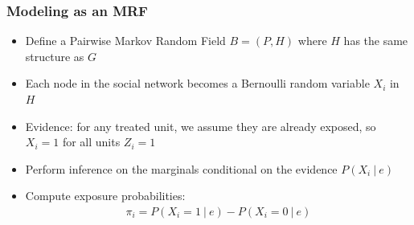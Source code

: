 \documentclass[
	11pt, %
]{beamer}
\begin{document}
\begin{frame}
	\frametitle{Modeling as an MRF}
	\begin{itemize}
		\setlength\itemsep{1em}
		\item Define a Pairwise Markov Random Field $B = (P, H)$ where $H$ has the same structure as $G$
		\item Each node in the social network becomes a Bernoulli random variable $X_i$ in $H$
		\item Evidence: for any treated unit, we assume they are already exposed, so $X_i = 1$ for all units $Z_i = 1$
		\item Perform inference on the marginals conditional on the evidence $P(X_i\ |\ e)$
		\item Compute exposure probabilities: \begin{align*}
			\pi_i = P(X_i = 1\ |\ e) - P(X_i = 0\ |\ e)
		\end{align*}
	\end{itemize}
\end{frame}
\end{document}
